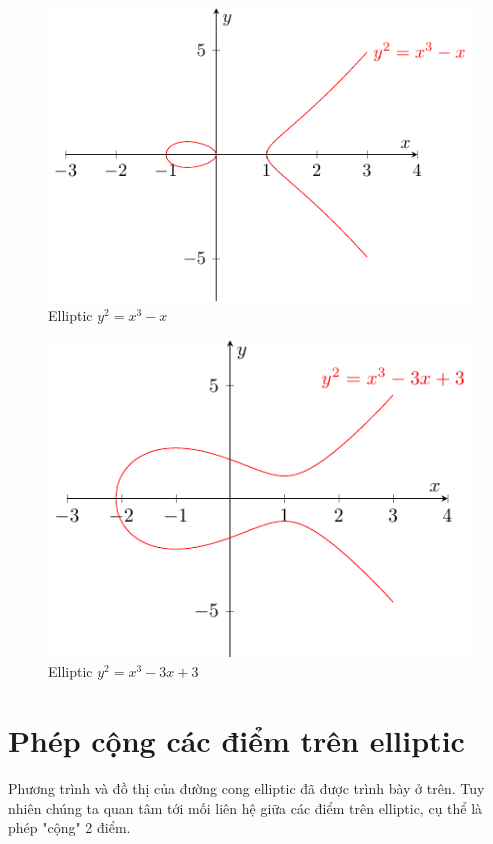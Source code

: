 \begin{figure}[ht]
    \centering
    \includegraphics{../pics/ecc/ecc2.pdf}
    \caption{Elliptic $y^2 = x^3 - x$}
    \label{ecc:2}
\end{figure}

\begin{figure}[ht]
    \centering
    \includegraphics{../pics/ecc/ecc3.pdf}
    \caption{Elliptic $y^2 = x^3 - 3x + 3$}
    \label{ecc:3}
\end{figure}

\section{Phép cộng các điểm trên elliptic}

Phương trình và đồ thị của đường cong elliptic đã được trình bày ở trên.
Tuy nhiên chúng ta quan tâm tới mối liên hệ giữa các điểm trên elliptic, 
cụ thể là phép "cộng" 2 điểm.

